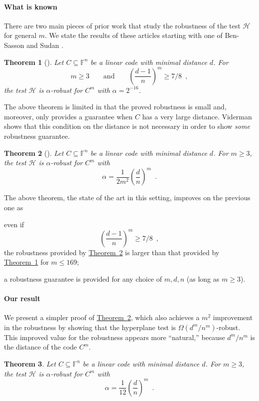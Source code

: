 \documentclass[11pt]{article}
\numberwithin{equation}{section}
\newtheorem{theorem}{Theorem}[section]
\theoremstyle{definition}
\theoremstyle{plain}
\newcommand{\expref}[2]{\hyperref[#2]{#1~\ref{#2}}}
\theoremstyle{plain}
\newtheorem{ftheorem}[theorem]{Theorem}
\newcommand{\colored}{}
\newcommand{\tester}{\colored{\mathcal H}} %
\newcommand{\codedist}{\colored{d}} %
\newcommand{\blocklength}{\colored{n}} %
\newcommand{\Field}{\colored{\mathbb F}}
\newcommand{\parhead}{\paragraph}
\begin{document}
\parhead{What is known}
There are two main
%
pieces of prior work  %
that study the robustness of the test $\tester$ for general $m$.
We state the results of these
%
articles  %
starting with one of Ben-Sasson and Sudan \cite{Ben-SassonS06}.

\begin{theorem}[\cite{Ben-SassonS06}]
\label{thm:bs}
Let $C \subseteq \Field^n$ be a linear code with minimal distance $d$.
For
\[
  m \geq 3\qquad\text{and}\qquad \left(\frac{\codedist-1}{\blocklength}\right)^m \geq 7/8\enspace,
\]
the test $\tester$ is $\alpha$-robust for $C^m$ with $\alpha = 2^{-16}$.
\end{theorem}

\noindent
The above theorem is limited in that the proved robustness is small and, moreover, only provides a guarantee when $C$ has a very large distance. Viderman \cite{Viderman12} shows that this condition on the distance is not necessary in order to show \emph{some} robustness guarantee.

\begin{theorem}[\cite{Viderman12}]
\label{thm:vid}
Let $C \subseteq \Field^n$ be a linear code with minimal distance $d$.
For $m \geq 3$, the test $\tester$ is $\alpha$-robust %
for   %
$C^m$ with
\[
  \alpha = \frac{1}{2 m^2} \left(\frac{\codedist}{\blocklength}\right)^m\enspace.
\]
\end{theorem}

\noindent
The above theorem, the state of the art in this setting, improves on the previous one as
\begin{inparaenum}[(i)]
\item even if
  \[
    \left(\frac{\codedist-1}{\blocklength}\right)^{m} \geq 7/8\enspace,
  \]
  the robustness provided by \expref{Theorem}{thm:vid} is larger than
  that provided by \expref{Theorem}{thm:bs} for $m \leq 169$;
  \item a robustness guarantee is provided for any choice of $m,\codedist,\blocklength$ (as long as $m \geq 3$).
\end{inparaenum}

\parhead{Our result}
We present a simpler proof of \expref{Theorem}{thm:vid}, which also achieves a $m^2$ improvement in the robustness by showing that the hyperplane test is $\Omega({\codedist^m}/{\blocklength^m})$-robust. This improved value for the robustness appears more ``natural,'' because ${\codedist^m}/{\blocklength^m}$ is the distance of the code $C^m$.


\begin{ftheorem}
\label{thm:pat-robustness}
Let $C \subseteq \Field^n$ be a linear code with minimal distance $d$.
For $m \geq 3$, the test $\tester$ is $\alpha$-robust for $C^m$ with
\[
  \alpha = \frac{1}{12} \left(\frac{\codedist}{\blocklength}\right)^m\enspace.
\]
\end{ftheorem}
\end{document}
